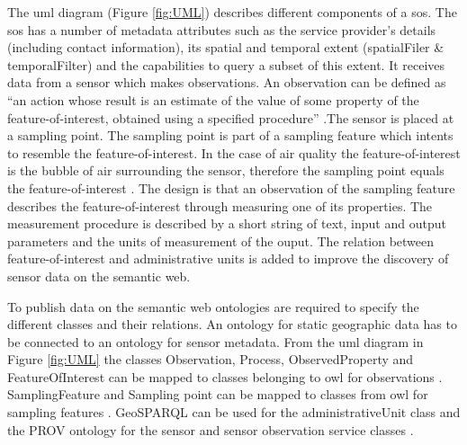 The \ac{uml} diagram (Figure \ref{fig:UML}) describes different components of a \ac{sos}. The \ac{sos} has a number of metadata attributes such as the service provider's details (including contact information), its spatial and temporal extent (spatialFiler \& temporalFilter) and the capabilities to query a subset of this extent. It receives data from a sensor which makes observations. An observation can be defined as \enquote{an action whose result is an estimate of the value of some property of the feature-of-interest, obtained using a specified procedure} \citep{SSW:Cox3}.The sensor is placed at a sampling point. The sampling point is part of a sampling feature which intents to resemble the feature-of-interest. In the case of air quality the feature-of-interest is the bubble of air surrounding the sensor, therefore the sampling point equals the feature-of-interest \citep{SDI:INSPIRE2}. The design is that an observation of the sampling feature describes the  feature-of-interest through measuring one of its properties. The measurement procedure is described by a short string of text, input and output parameters and the units of measurement of the ouput. The relation between feature-of-interest and administrative units is added to improve the discovery of sensor data on the semantic web. 

To publish data on the semantic web ontologies are required to specify the different classes and their relations. An ontology for static geographic data has to be connected to an ontology for sensor metadata. From the \ac{uml} diagram in Figure \ref{fig:UML} the classes Observation, Process, ObservedProperty and FeatureOfInterest can be mapped to classes belonging to \ac{owl} for observations \citep{SSW:Cox}. SamplingFeature and Sampling point can be mapped to classes from \ac{owl} for sampling features \citep{SSW:Cox2}. GeoSPARQL can be used for the administrativeUnit class \citep{LD:OGC} and the PROV ontology for the sensor and sensor observation service classes \citep{LD:W3C2}. 


